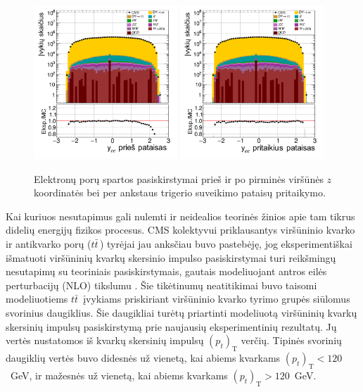 \documentclass[a4paper, 12pt, oneside]{article}
\newcommand{\ttbar}{t\bar{t}}
\begin{document}
\begin{figure}[t!]
	\includegraphics[width=0.48\textwidth]{Magistrinis/ee_rapi_before.png}
	\includegraphics[width=0.48\textwidth]{Magistrinis/ee_rapi_after.png}
	\vspace{-0.5cm}
	\caption{\label{fig:rapiba} Elektronų porų spartos pasiskirstymai prieš ir po pirminės viršūnės $z$ koordinatės bei per ankstaus
	trigerio suveikimo pataisų pritaikymo.}
\end{figure}

Kai kuriuos nesutapimus gali nulemti ir neidealios teorinės žinios apie tam tikrus didelių energijų fizikos procesus.
CMS kolektyvui priklausantys viršūninio kvarko ir antikvarko porų ($\ttbar\,$) tyrėjai jau anksčiau buvo pastebėję, jog
eksperimentiškai išmatuoti viršūninių kvarkų skersinio impulso pasiskirstymai turi reikšmingų nesutapimų su teoriniais
pasiskirstymais, gautais modeliuojant antros eilės perturbacijų (NLO) tikslumu \cite{ttbarPT}.
Šie tikėtinumų neatitikimai buvo taisomi modeliuotiems $\ttbar\,$ įvykiams priskiriant viršūninio kvarko tyrimo grupės
siūlomus svorinius daugiklius.
Šie daugikliai turėtų priartinti modeliuotą viršūninių kvarkų skersinių impulsų pasiskirstymą prie naujausių eksperimentinių rezultatų.
Jų vertės nustatomos iš kvarkų skersinių impulsų $(p_{t})_{\mathrm{T}}$ verčių.
Tipinės svorinių daugiklių vertės buvo didesnės už vienetą, kai abiems kvarkams $(p_{t})_{\mathrm{T}}<120$~GeV, ir mažesnės už vienetą,
kai abiems kvarkams $(p_{t})_{\mathrm{T}}>120$~GeV.
\end{document}
